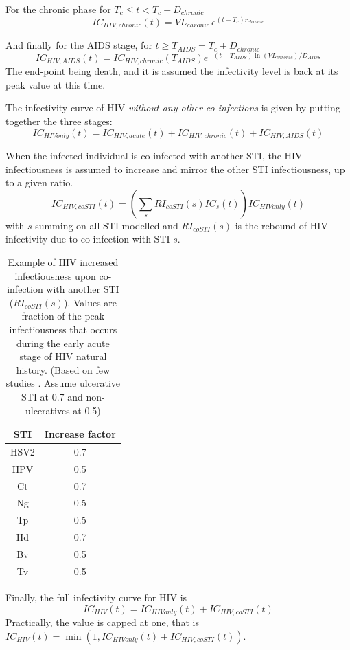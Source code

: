 \documentclass[11pt, onecolumn]{article}
\begin{document}
For the chronic phase for $T_c\leq t < T_c+D_{chronic}$
$$ IC_{HIV,chronic}(t) = VL_{chronic} \, e^{(t-T_c)r_{chronic}} $$

And finally for the AIDS stage, for $ t \geq T_{AIDS}= T_c+D_{chronic}$
$$IC_{HIV,AIDS}(t) = IC_{HIV,chronic}(T_{AIDS}) e^{-(t-T_{AIDS}) \ln(VL_{chronic})/D_{AIDS}}$$
The end-point being death, and it is assumed the infectivity level is back at its peak value at this time.

The infectivity curve of HIV \emph{without any other co-infections} is given by putting together the three stages:
$$ IC_{HIVonly}(t) = IC_{HIV,acute}(t)+IC_{HIV,chronic}(t)+IC_{HIV,AIDS}(t)$$

When the infected individual is co-infected with another STI, the HIV infectiousness is assumed to increase and mirror the other STI infectiousness, up to a given ratio.
$$IC_{HIV,coSTI}(t) = \left(\sum_s RI_{coSTI}(s) IC_{s}(t)\right)  IC_{HIVonly}(t) $$
with $s$ summing on all STI modelled and $RI_{coSTI}(s)$ is the rebound of HIV infectivity due to co-infection with STI $s$.

\begin{table}[htdp]
\begin{center}
\begin{tabular}{|c|c|}
\hline
STI & Increase factor \\
\hline
HSV2 & 0.7\\
HPV & 0.5\\
Ct & 0.7\\
Ng & 0.5\\
Tp & 0.5\\
Hd & 0.7\\
Bv & 0.5\\
Tv & 0.5\\
\hline
\end{tabular}
\end{center}
\caption{Example of HIV increased infectiousness upon co-infection with another STI ($RI_{coSTI}(s)$). Values are fraction of the peak infectiousness that occurs during the early acute stage of HIV natural history. (Based on few studies \cite{Cohen:1997kj,Dyer:1998we}. Assume ulcerative STI at 0.7 and non-ulceratives at 0.5)}
\label{Table:rebound}
\end{table}%



Finally, the full infectivity curve for HIV is
$$ IC_{HIV}(t) = IC_{HIVonly}(t)+IC_{HIV,coSTI}(t)$$
Practically, the value is capped at one, that is $ IC_{HIV}(t) = \min(1,IC_{HIVonly}(t)+IC_{HIV,coSTI}(t))$. 
\end{document}
